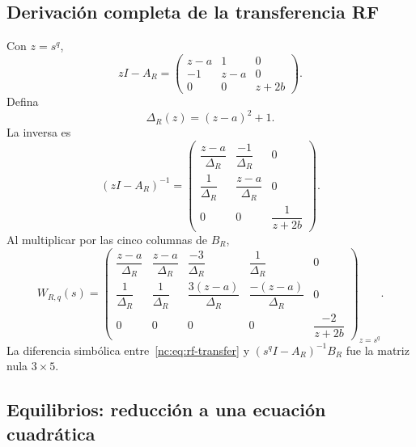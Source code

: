 \subsection{Derivación completa de la transferencia RF}

Con \(z=s^q\),
\begin{equation}
 zI-A_R=
 \begin{pmatrix}
 z-a&1&0\\-1&z-a&0\\0&0&z+2b
 \end{pmatrix}.
\end{equation}
Defina
\begin{equation}
 \Delta_R(z)=(z-a)^2+1.
 \label{nc:eq:rf-delta}
\end{equation}
La inversa es
\begin{equation}
 (zI-A_R)^{-1}=
 \begin{pmatrix}
 \dfrac{z-a}{\Delta_R}&\dfrac{-1}{\Delta_R}&0\\[7pt]
 \dfrac{1}{\Delta_R}&\dfrac{z-a}{\Delta_R}&0\\[7pt]
 0&0&\dfrac{1}{z+2b}
 \end{pmatrix}.
\end{equation}
Al multiplicar por las cinco columnas de \(B_R\),
\begin{equation}
 W_{R,q}(s)=
 \begin{pmatrix}
 \dfrac{z-a}{\Delta_R}&
 \dfrac{z-a}{\Delta_R}&
 \dfrac{-3}{\Delta_R}&
 \dfrac{1}{\Delta_R}&0\\[8pt]
 \dfrac{1}{\Delta_R}&
 \dfrac{1}{\Delta_R}&
 \dfrac{3(z-a)}{\Delta_R}&
 \dfrac{-(z-a)}{\Delta_R}&0\\[8pt]
 0&0&0&0&\dfrac{-2}{z+2b}
 \end{pmatrix}_{z=s^q}.
 \label{nc:eq:rf-transfer}
\end{equation}
La diferencia simbólica entre~\eqref{nc:eq:rf-transfer} y
\((s^qI-A_R)^{-1}B_R\) fue la matriz nula \(3\times5\).

\subsection{Equilibrios: reducción a una ecuación cuadrática}

